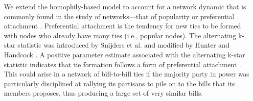 \documentclass{llncs}
\begin{document}
We extend the homophily-based model to account for a network dynamic that is commonly found in the study of networks---that of popularity or preferential attachment \cite{barabasi1999emergence}. Preferential attachment is the tendency for new ties to be formed with nodes who already have many ties (i.e., popular nodes).  The alternating k-star statistic was introduced by Snijders et al. \cite{SnijdersTomA.B..2006} and modified by Hunter and Handcock  \cite{Hunter.2006}. A positive parameter estimate associated with the alternating k-star statistic indicates that tie formation follows a form of preferential attachment \cite{SnijdersTomA.B..2006}. This could arise in a network of bill-to-bill ties if the majority party in power was particularly disciplined at rallying its partisans to pile on to the bills that its members proposes, thus producing a large set of very similar bills. %
\end{document}
